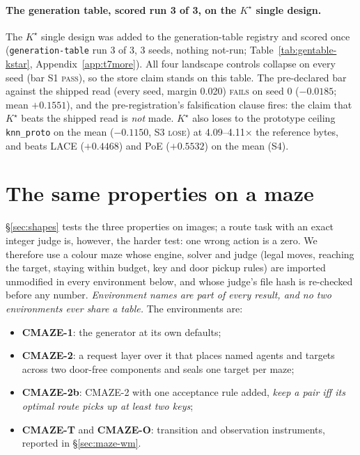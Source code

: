 \documentclass{article} %
\newcommand{\Kstar}{\ensuremath{K^{\star}}}
\begin{document}
\paragraph{The generation table, scored run 3 of 3, on the $\Kstar$ single design.}
The $\Kstar$ single design was added to the generation-table registry and scored once
(\texttt{generation-table} run 3 of 3, 3 seeds, nothing not-run; Table~\ref{tab:gentable-kstar}, %
Appendix~\ref{app:t7more}). All four landscape controls collapse on every seed (bar S1 %
\textsc{pass}), so the store claim stands on this table. The pre-declared bar against the shipped
read (every seed, margin 0.020) \textsc{fails} on seed 0 ($-0.0185$; mean $+0.1551$), and the %
pre-registration's falsification clause fires: the claim that $\Kstar$ beats the shipped read is
\emph{not} made. $\Kstar$ also loses to the prototype ceiling \texttt{knn\_proto} on the mean %
($-0.1150$, S3 \textsc{lose}) at 4.09--4.11$\times$ the reference bytes, and beats LACE %
($+0.4468$) and PoE ($+0.5532$) on the mean (S4). %

\section{The same properties on a maze}
\label{sec:maze}

\S\ref{sec:shapes} tests the three properties on images; a route task with an exact integer judge is, however, the harder test: one wrong action is a zero. We therefore use a colour maze whose engine, solver and judge (legal
moves, reaching the target, staying within budget, key and door pickup rules) are imported
unmodified in every environment below, and whose judge's file hash is re-checked before any
number. %
\emph{Environment names are part of every result, and no two environments ever share a
table.} The environments are:
\begin{itemize}[leftmargin=*,nosep]
\item \textbf{CMAZE-1}: the generator at its own defaults;
\item \textbf{CMAZE-2}: a request layer over it that places named agents and targets across two
  door-free components and seals one target per maze;
\item \textbf{CMAZE-2b}: CMAZE-2 with one acceptance rule added, \emph{keep a pair iff its
  optimal route picks up at least two keys};
\item \textbf{CMAZE-T} and \textbf{CMAZE-O}: transition and observation instruments, reported in \S\ref{sec:maze-wm}.
\end{itemize}
\end{document}
